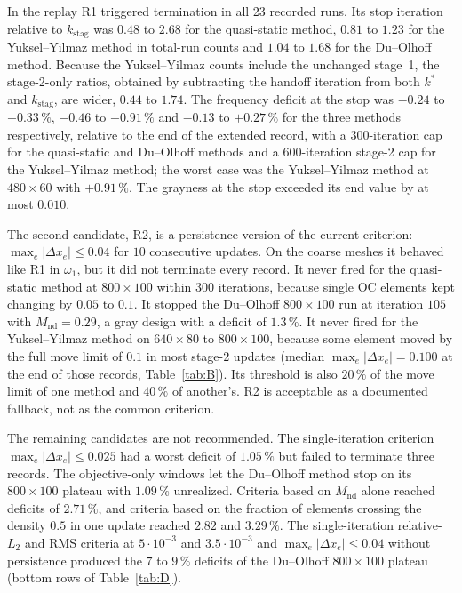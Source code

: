 \documentclass[11pt,a4paper]{article}
\newcommand{\Mnd}{M_{\mathrm{nd}}}
\newcommand{\kstag}{k_{\mathrm{stag}}}
\newcommand{\maxdx}{\max_e|\Delta x_e|}
\newcommand{\me}[2]{$#1\times#2$}
\begin{document}
In the replay R1 triggered termination in all 23 recorded runs. Its stop iteration relative to $\kstag$ was $0.48$ to $2.68$ for the quasi-static method, $0.81$ to $1.23$ for the Yuksel--Yilmaz method in total-run counts and $1.04$ to $1.68$ for the Du--Olhoff method. Because the Yuksel--Yilmaz counts include the unchanged stage~1, the stage-2-only ratios, obtained by subtracting the handoff iteration from both $k^*$ and $\kstag$, are wider, $0.44$ to $1.74$. The frequency deficit at the stop was $-0.24$ to $+0.33\,\%$, $-0.46$ to $+0.91\,\%$ and $-0.13$ to $+0.27\,\%$ for the three methods respectively, relative to the end of the extended record, with a 300-iteration cap for the quasi-static and Du--Olhoff methods and a 600-iteration stage-2 cap for the Yuksel--Yilmaz method; the worst case was the Yuksel--Yilmaz method at \me{480}{60} with $+0.91\,\%$. The grayness at the stop exceeded its end value by at most $0.010$.

The second candidate, R2, is a persistence version of the current criterion: $\maxdx \le 0.04$ for $10$ consecutive updates. On the coarse meshes it behaved like R1 in $\omega_1$, but it did not terminate every record. It never fired for the quasi-static method at \me{800}{100} within 300 iterations, because single OC elements kept changing by $0.05$ to $0.1$. It stopped the Du--Olhoff \me{800}{100} run at iteration $105$ with $\Mnd = 0.29$, a gray design with a deficit of $1.3\,\%$. It never fired for the Yuksel--Yilmaz method on \me{640}{80} to \me{800}{100}, because some element moved by the full move limit of $0.1$ in most stage-2 updates (median $\maxdx = 0.100$ at the end of those records, Table~\ref{tab:B}). Its threshold is also $20\,\%$ of the move limit of one method and $40\,\%$ of another's. R2 is acceptable as a documented fallback, not as the common criterion.

The remaining candidates are not recommended. The single-iteration criterion $\maxdx \le 0.025$ had a worst deficit of $1.05\,\%$ but failed to terminate three records. The objective-only windows let the Du--Olhoff method stop on its \me{800}{100} plateau with $1.09\,\%$ unrealized. Criteria based on $\Mnd$ alone reached deficits of $2.71\,\%$, and criteria based on the fraction of elements crossing the density $0.5$ in one update reached $2.82$ and $3.29\,\%$. The single-iteration relative-$L_2$ and RMS criteria at $5\cdot10^{-3}$ and $3.5\cdot10^{-3}$ and $\maxdx \le 0.04$ without persistence produced the $7$ to $9\,\%$ deficits of the Du--Olhoff \me{800}{100} plateau (bottom rows of Table~\ref{tab:D}).
\end{document}
